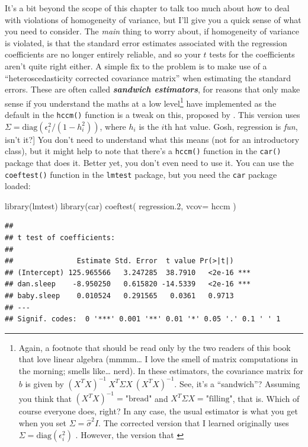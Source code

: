 \documentclass[
]{book}
\newenvironment{Shaded}{\begin{snugshade}}{\end{snugshade}}
\newcommand{\AttributeTok}[1]{\textcolor[rgb]{0.77,0.63,0.00}{#1}}
\newcommand{\FloatTok}[1]{\textcolor[rgb]{0.00,0.00,0.81}{#1}}
\newcommand{\FunctionTok}[1]{\textcolor[rgb]{0.00,0.00,0.00}{#1}}
\newcommand{\NormalTok}[1]{#1}
\begin{document}
It's a bit beyond the scope of this chapter to talk too much about how to deal with violations of homogeneity of variance, but I'll give you a quick sense of what you need to consider. The \emph{main} thing to worry about, if homogeneity of variance is violated, is that the standard error estimates associated with the regression coefficients are no longer entirely reliable, and so your \(t\) tests for the coefficients aren't quite right either. A simple fix to the problem is to make use of a ``heteroscedasticity corrected covariance matrix'' when estimating the standard errors. These are often called \textbf{\emph{sandwich estimators}}, for reasons that only make sense if you understand the maths at a low level\footnote{Again, a footnote that should be read only by the two readers of this book that love linear algebra (mmmm\ldots{} I love the smell of matrix computations in the morning; smells like\ldots{} nerd). In these estimators, the covariance matrix for \(b\) is given by \((X^T X)^{-1}\  X^T \Sigma X \ (X^T X)^{-1}\). See, it's a ``sandwich''? Assuming you think that \((X^T X)^{-1} = \mbox{"bread"}\) and \(X^T \Sigma X = \mbox{"filling"}\), that is. Which of course everyone does, right? In any case, the usual estimator is what you get when you set \(\Sigma = \hat\sigma^2 I\). The corrected version that I learned originally uses \(\Sigma = \mbox{diag}(\epsilon_i^2)\) \citep{White1980}. However, the version that \citet{Fox2011}} have implemented as the default in the \texttt{hccm()} function is a tweak on this, proposed by \citet{Long2000}. This version uses \(\Sigma = \mbox{diag}(\epsilon_i^2/(1-h_i^2))\), where \(h_i\) is the \(i\)th hat value. Gosh, regression is \emph{fun}, isn't it?{]} You don't need to understand what this means (not for an introductory class), but it might help to note that there's a \texttt{hccm()} function in the \texttt{car()} package that does it. Better yet, you don't even need to use it. You can use the \texttt{coeftest()} function in the \texttt{lmtest} package, but you need the \texttt{car} package loaded:

\begin{Shaded}
\begin{Highlighting}[]
\FunctionTok{library}\NormalTok{(lmtest)}
\FunctionTok{library}\NormalTok{(car)}
\FunctionTok{coeftest}\NormalTok{( regression}\FloatTok{.2}\NormalTok{, }\AttributeTok{vcov=}\NormalTok{ hccm )}
\end{Highlighting}
\end{Shaded}

\begin{verbatim}
## 
## t test of coefficients:
## 
##               Estimate Std. Error  t value Pr(>|t|)    
## (Intercept) 125.965566   3.247285  38.7910   <2e-16 ***
## dan.sleep    -8.950250   0.615820 -14.5339   <2e-16 ***
## baby.sleep    0.010524   0.291565   0.0361   0.9713    
## ---
## Signif. codes:  0 '***' 0.001 '**' 0.01 '*' 0.05 '.' 0.1 ' ' 1
\end{verbatim}
\end{document}

